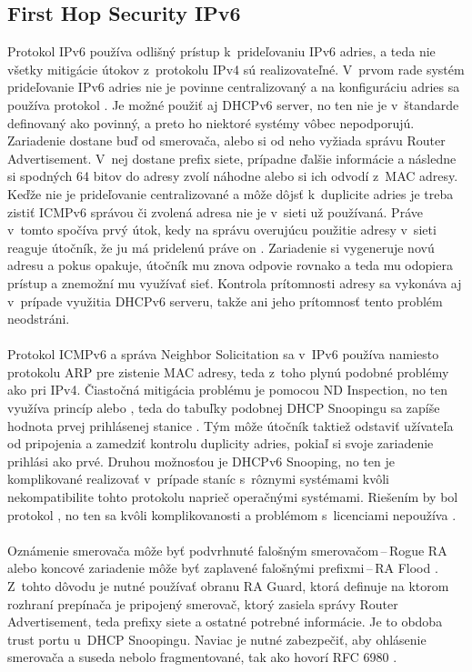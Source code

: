 \subsection{First Hop Security IPv6}
Protokol IPv6 používa odlišný prístup k~prideľovaniu IPv6 adries, a teda nie všetky mitigácie útokov z~protokolu IPv4 sú realizovateľné. V~prvom rade systém prideľovanie IPv6 adries nie je povinne centralizovaný a na konfiguráciu adries sa používa protokol . Je možné použiť aj DHCPv6 server, no ten nie je v~štandarde definovaný ako povinný, a preto ho niektoré systémy vôbec nepodporujú. Zariadenie dostane buď od smerovača, alebo si od neho  vyžiada správu Router Advertisement. V~nej dostane prefix siete, prípadne ďalšie informácie a následne si spodných 64 bitov do adresy zvolí náhodne alebo si ich odvodí z~MAC adresy. Keďže nie je prideľovanie centralizované a môže dôjsť k~duplicite adries je treba zistiť ICMPv6 správou či zvolená adresa nie je v~sieti už používaná. Práve v~tomto spočíva prvý útok, kedy na správu overujúcu použitie adresy v~sieti reaguje útočník, že ju má pridelenú práve on \cite{Hg83oflOfHBGeWfs}. Zariadenie si vygeneruje novú adresu a pokus opakuje, útočník mu znova odpovie rovnako a teda mu odopiera prístup a znemožní mu využívať sieť. Kontrola prítomnosti adresy sa vykonáva aj v~prípade využitia DHCPv6 serveru, takže ani jeho prítomnosť tento problém neodstráni. 
\\\\   
\noindent
Protokol ICMPv6 a správa Neighbor Solicitation sa v~IPv6 používa namiesto protokolu ARP pre zistenie MAC adresy, teda z~toho plynú podobné problémy ako pri IPv4. Čiastočná mitigácia problému je pomocou ND Inspection, no ten využíva princíp  alebo , teda do tabuľky podobnej DHCP Snoopingu sa zapíše hodnota prvej prihlásenej stanice \cite{Gregr522015}\cite{Podermanski1222015}. Tým môže útočník taktiež odstaviť užívateľa od pripojenia a zamedziť kontrolu duplicity adries, pokiaľ si svoje zariadenie prihlási ako prvé. Druhou možnosťou je DHCPv6 Snooping, no ten je komplikované realizovať v~prípade staníc s~rôznymi systémami kvôli nekompatibilite tohto protokolu naprieč operačnými systémami. Riešením by bol protokol , no ten sa kvôli komplikovanosti a problémom s~licenciami nepoužíva \cite{Alsadeh1252015}.
\\\\   
\noindent
Oznámenie smerovača môže byť podvrhnuté falošným smerovačom\,--\,Rogue RA alebo koncové zariadenie môže byť zaplavené falošnými prefixmi\,--\,RA Flood \cite{Gregr522015}\cite{Podermanski1222015}. Z~tohto dôvodu je nutné používať obranu RA Guard, ktorá definuje na ktorom rozhraní prepínača je pripojený smerovač, ktorý zasiela správy Router Advertisement, teda prefixy siete a ostatné potrebné informácie. Je to obdoba trust portu u~DHCP Snoopingu. Naviac je nutné zabezpečiť, aby ohlásenie smerovača a suseda nebolo fragmentované, tak ako hovorí RFC 6980 \cite{rfc6980YBLH6JtaHyFaxE8i}.
